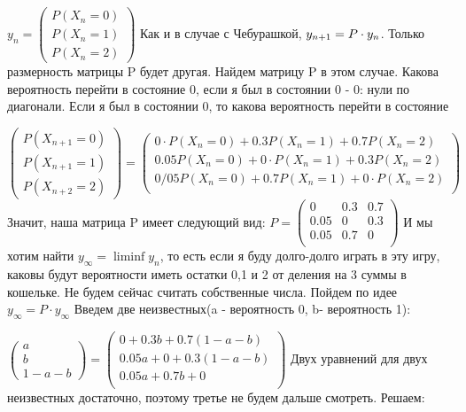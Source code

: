  $y_n=\left( \begin{array}{l}
		P(X_n=0)\\
		P(X_n=1)\\
		P(X_n=2)
		\end{array} \right) $
Как и в случае с Чебурашкой, $y_{n+1}=P\cdot y_n\\ $. Только размерность матрицы P будет другая. Найдем матрицу P в этом случае. 
Какова вероятность перейти в состояние 0, если я был в состоянии 0 - 0: нули по диагонали.
Если я был в состоянии 0, то какова вероятность перейти в состояние 

$\left( \begin{array}{l}
		P(X_{n+1}=0)\\
		P(X_{n+1}=1)\\
		P(X_{n+2}=2)
		\end{array} \right)=
\left( \begin{array}{l}
		0\cdot P(X_n=0)+0.3P(X_n=1)+0.7P(X_n=2)\\
		0.05P(X_n=0)+0\cdot P(X_n=1)+0.3P(X_n=2)\\
		0/05P(X_n=0)+0.7P(X_n=1)+0\cdot P(X_n=2)\\
		\end{array} \right) $
Значит, наша матрица P имеет следующий вид:
$P=\left( \begin{array}{lll}
		0    &0.3 & 0.7\\
		0.05 &0 & 0.3\\
		0.05 &0.7 & 0\\
		\end{array} \right) $
И мы хотим найти $y_\infty=\liminf{y_n}$, то есть если я буду долго-долго играть в эту игру, каковы будут вероятности иметь остатки 0,1 и 2 от деления на 3 суммы в кошельке. Не будем сейчас считать собственные числа. Пойдем по идее $y_\infty=P\cdot y_\infty$
Введем две неизвестных(a - вероятность 0, b- вероятность 1): 

$\left( \begin{array}{l}
		a\\
		b\\
		1-a-b
		\end{array} \right)=
\left( \begin{array}{l}
		0+0.3b+0.7(1-a-b)\\
		0.05a+0+0.3(1-a-b)\\
		0.05a+0.7b+0\\
		\end{array} \right) $
Двух уравнений для двух неизвестных достаточно, поэтому третье не будем дальше смотреть.
Решаем:

